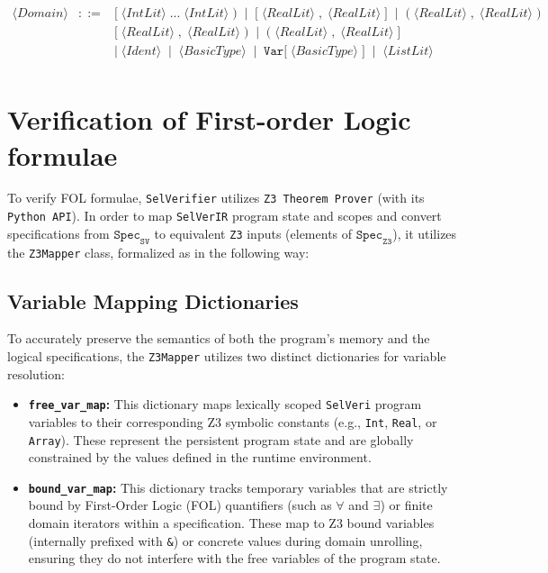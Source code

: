 \documentclass{article}
\begin{document}
\[\begin{array}{rcl}
\langle \mathit{Domain} \rangle
&::=&
\mathtt{[}\; \langle \mathit{IntLit} \rangle \; \mathtt{...}\; \langle \mathit{IntLit} \rangle \; \mathtt{)}
\;\mid\;
\mathtt{[}\; \langle \mathit{RealLit} \rangle \; \mathtt{,}\; \langle \mathit{RealLit} \rangle \; \mathtt{]}
\;\mid\;
\mathtt{(}\; \langle \mathit{RealLit} \rangle \; \mathtt{,}\; \langle \mathit{RealLit} \rangle \; \mathtt{)} \\[2pt]
&&
\mathtt{[}\; \langle \mathit{RealLit} \rangle \; \mathtt{,}\; \langle \mathit{RealLit} \rangle \; \mathtt{)}
\;\mid\;
\mathtt{(}\; \langle \mathit{RealLit} \rangle \; \mathtt{,}\; \langle \mathit{RealLit} \rangle \; \mathtt{]} \\[2pt]
&&
\mid\;
\langle \mathit{Ident} \rangle
\;\mid\;
\langle \mathit{BasicType} \rangle
\;\mid\;
\mathtt{Var[} \; \langle \mathit{BasicType} \rangle \; \mathtt{]}
\;\mid\;
\langle \mathit{ListLit} \rangle \\[4pt]
\end{array}
\]

\newpage
\section{Verification of First-order Logic formulae}
To verify FOL formulae, \texttt{SelVerifier} utilizes \texttt{Z3 Theorem Prover} (with its \texttt{Python API}). In order to map \texttt{SelVerIR} program state and scopes and convert specifications from $\mathtt{Spec}_{\mathtt{SV}}$ to equivalent \texttt{Z3} inputs (elements of $\mathtt{Spec}_{\mathtt{Z3}}$), it utilizes the \texttt{Z3Mapper} class, formalized as in the following way:

\subsection{Variable Mapping Dictionaries}
To accurately preserve the semantics of both the program's memory and the logical specifications, the \texttt{Z3Mapper} utilizes two distinct dictionaries for variable resolution:

\begin{itemize}
    \item \textbf{\texttt{free\_var\_map}:} This dictionary maps lexically scoped \texttt{SelVeri} program variables to their corresponding Z3 symbolic constants (e.g., \texttt{Int}, \texttt{Real}, or \texttt{Array}). These represent the persistent program state and are globally constrained by the values defined in the runtime environment.
    
    \item \textbf{\texttt{bound\_var\_map}:} This dictionary tracks temporary variables that are strictly bound by First-Order Logic (FOL) quantifiers (such as $\forall$ and $\exists$) or finite domain iterators within a specification. These map to Z3 bound variables (internally prefixed with \texttt{\&}) or concrete values during domain unrolling, ensuring they do not interfere with the free variables of the program state.
\end{itemize}
\end{document}
